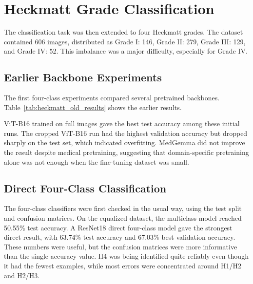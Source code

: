 \section{Heckmatt Grade Classification}
The classification task was then extended to four Heckmatt grades. The dataset contained 606 images, distributed as Grade I: 146, Grade II: 279, Grade III: 129, and Grade IV: 52. This imbalance was a major difficulty, especially for Grade IV.

\subsection{Earlier Backbone Experiments}
The first four-class experiments compared several pretrained backbones. Table~\ref{tab:heckmatt_old_results} shows the earlier results.

\begin{table}[H]
\centering
{}
\caption{Earlier Heckmatt grading results across backbone architectures}
\label{tab:heckmatt_old_results}
\end{table}

ViT-B16 trained on full images gave the best test accuracy among these initial runs. The cropped ViT-B16 run had the highest validation accuracy but dropped sharply on the test set, which indicated overfitting. MedGemma did not improve the result despite medical pretraining, suggesting that domain-specific pretraining alone was not enough when the fine-tuning dataset was small.

\subsection{Direct Four-Class Classification}
The four-class classifiers were first checked in the usual way, using the test split and confusion matrices. On the equalized dataset, the multiclass model reached 50.55\% test accuracy. A ResNet18 direct four-class model gave the strongest direct result, with 63.74\% test accuracy and 67.03\% best validation accuracy. These numbers were useful, but the confusion matrices were more informative than the single accuracy value. H4 was being identified quite reliably even though it had the fewest examples, while most errors were concentrated around H1/H2 and H2/H3.

